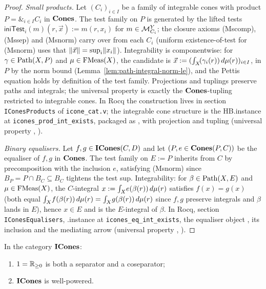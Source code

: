 \begin{proof}
\emph{Small products.} Let $(C_i)_{i \in I}$ be a family of
integrable cones with product $P = \mathbin{\&}_{i \in I} C_i$ in
$\mathbf{Cones}$. The test family on $P$ is generated by the lifted tests
$\mathsf{iniTest}_i(m)(r, \vec{x}) := m(r, x_i)$ for
$m \in \mathcal{M}^Y_{C_i}$; the closure axioms (Mscomp), (Mssep) and
(Msnorm) carry over from each $C_i$ (uniform existence-of-test for
(Msnorm) uses that $\lVert \vec{x} \rVert = \sup_i \lVert x_i \rVert$).
Integrability is componentwise: for $\gamma \in \mathrm{Path}(X, P)$ and
$\mu \in \mathrm{FMeas}(X)$, the candidate is
$\vec{x} := (\int_{X}\!(\gamma_i(r))\,d\mu(r))_{i \in I}$, in
$P$ by the norm bound (Lemma~\ref{lem:path-integral-norm-le}), and
the Pettis equation holds by definition of the test family.
Projections and tuplings preserve paths and integrals; the universal
property is exactly the $\mathbf{Cones}$-tupling restricted to integrable
cones. In Rocq the construction lives in section
\texttt{IConesProducts} of \texttt{icone\_cat.v}; the integrable cone
structure is the HB.instance at
\texttt{icones\_prod\_int\_exists}, packaged as
, with projection
 and tupling
 (universal property
,
).

\emph{Binary equalisers.} Let $f, g \in \mathbf{ICones}(C, D)$ and let
$(P, e \in \mathbf{Cones}(P, C))$ be the equaliser of $f, g$ in $\mathbf{Cones}$. The
test family on $E := P$ inherits from $C$ by precomposition with the
inclusion $e$, satisfying (Msnorm) since $B_P = P \cap B_C \subseteq
B_C$ tightens the test sup. Integrability: for $\beta \in \mathrm{Path}(X, E)$
and $\mu \in \mathrm{FMeas}(X)$, the $C$-integral
$x := \int_{X}\!e(\beta(r))\,d\mu(r)$ satisfies $f(x) = g(x)$
(both equal $\int_{X}\!f(\beta(r))\,d\mu(r) =
\int_{X}\!g(\beta(r))\,d\mu(r)$ since $f, g$ preserve integrals
and $\beta$ lands in $E$), hence $x \in E$ and is the $E$-integral
of $\beta$. In Rocq, section \texttt{IConesEqualisers},
\HB.instance at \texttt{icones\_eq\_int\_exists}, the equaliser
object , its inclusion
 and the mediating
arrow  (universal
property ,
).
\end{proof}

\begin{theorem}\label{thm:icones-well-powered}
In the category $\mathbf{ICones}$:
\begin{enumerate}
  \item $1 = \mathbb{R}_{\geq 0}$ is both a separator and a coseparator;
  \item $\mathbf{ICones}$ is well-powered.
\end{enumerate}
\end{theorem}

